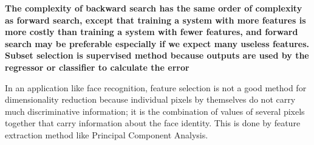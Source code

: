 \textbf {The complexity of backward search has the same order of complexity as forward search, except that training a system with more features is more costly than training a system with fewer features, and forward search may be preferable especially if we expect many useless features.
Subset selection is supervised method because outputs are used by the regressor or classifier to calculate the error}

In an application like face recognition, feature selection is not a good method for dimensionality reduction because individual pixels by themselves do not carry much discriminative information; it is the combination of values of several pixels together that carry information about the face identity. This is done by feature extraction method like Principal Component Analysis.